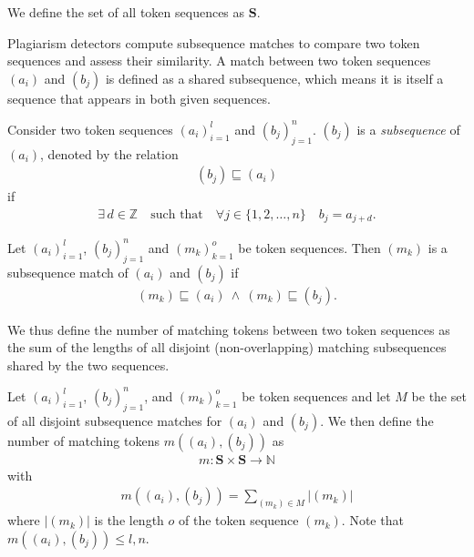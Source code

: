 \begin{theorem}
    We define the set of all token sequences as \(\mathbf{S}\).
\end{theorem}

Plagiarism detectors compute subsequence matches to compare two token sequences and assess their similarity.
A match between two token sequences \((a_i)\) and \((b_j)\) is defined as a shared subsequence, which means it is itself a sequence that appears in both given sequences.

\begin{theorem}[Subsequence]
    Consider two token sequences \((a_i)_{i=1}^l\) and \((b_j)_{j=1}^n\). \((b_j)\) is a \textit{subsequence} of \((a_i)\), denoted by the relation
    \begin{align*}
         (b_j) \sqsubseteq (a_i)
    \end{align*}
    if 
    \begin{align*}
         \exists \, d \in \mathbb{Z} \quad \text{such that} \quad \forall j \in \{1, 2, \ldots, n\} \quad b_j = a_{j+d}.
    \end{align*}
\end{theorem}

\begin{theorem}\label{def:subsequence-match}
    Let \((a_i)_{i=1}^l\), \((b_j)_{j=1}^n\) and \((m_k)_{k=1}^o\) be token sequences.
    Then \((m_k)\) is a subsequence match of \((a_i)\) and \((b_j)\) if
    \begin{align*}
        (m_k) \sqsubseteq (a_i) \: \land \: (m_k) \sqsubseteq (b_j).
    \end{align*}
\end{theorem}

We thus define the number of matching tokens between two token sequences as the sum of the lengths of all disjoint (non-overlapping) matching subsequences shared by the two sequences.

\begin{theorem}\label{def:matching-tokens}
    Let \((a_i)_{i=1}^l\), \((b_j)_{j=1}^n\), and \((m_k)_{k=1}^o\) be token sequences and let \(M\) be the set of all disjoint subsequence matches for \((a_i)\) and \((b_j)\).
    We then define the number of matching tokens \(m((a_i), (b_j))\) as
    \begin{align*}
        m : \mathbf{S} \times \mathbf{S} \rightarrow \mathbb{N}
    \end{align*}
    with
    \begin{align*}
        m((a_i), (b_j)) = \sum_{(m_k) \in M}|(m_k)|
    \end{align*}
    where \(|(m_k)|\) is the length \(o\) of the token sequence \((m_k)\). Note that \(m((a_i), (b_j)) \leq l, n\).
\end{theorem} 

